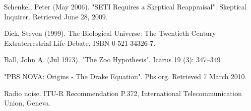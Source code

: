 \documentclass{article}
\begin{document}

\begin{thebibliography}{9}

Schenkel, Peter (May 2006). "SETI Requires a Skeptical Reappraisal". Skeptical Inquirer. Retrieved June 28, 2009.

 Dick, Steven (1999). The Biological Universe: The Twentieth Century Extraterrestrial Life Debate. ISBN 0-521-34326-7.

Ball, John A. (Jul 1973). "The Zoo Hypothesis". Icarus 19 (3): 347–349

"PBS NOVA: Origins - The Drake Equation". Pbs.org. Retrieved 7 March 2010.

Radio noise. ITU-R Recommendation P.372, International Telecommunication Union, Geneva.

\end{thebibliography}
\end{document}
